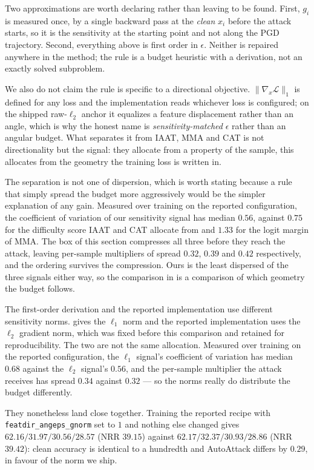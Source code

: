 Two approximations are worth declaring rather than leaving to be found. First, $g_i$ is measured once,
by a single backward pass at the \emph{clean} $x_i$ before the attack starts, so it is the sensitivity
at the starting point and not along the PGD trajectory. Second, everything above is first order in
$\epsilon$. Neither is repaired anywhere in the method; the rule is a budget heuristic with a
derivation, not an exactly solved subproblem.

We also do not claim the rule is specific to a directional objective. $\lVert\nabla_x\mathcal{L}\rVert_1$
is defined for any loss and the implementation reads whichever loss is configured; on the shipped
raw-$\ell_2$ anchor it equalizes a feature displacement rather than an angle, which is why the honest
name is \emph{sensitivity-matched} $\epsilon$ rather than an angular budget. What separates it from
IAAT, MMA and CAT is not directionality but the signal: they allocate from a property of the sample,
this allocates from the geometry the training loss is written in.

The separation is not one of dispersion, which is worth stating because a rule that simply spread the
budget more aggressively would be the simpler explanation of any gain. Measured over training on the
reported configuration, the coefficient of variation of our sensitivity signal has median $0.56$,
against $0.75$ for the difficulty score IAAT and CAT allocate from and $1.33$ for the logit margin of
MMA. The box of this section compresses all three before they reach the attack, leaving per-sample
multipliers of spread $0.32$, $0.39$ and $0.42$ respectively, and the ordering survives the
compression. Ours is the least dispersed of the three signals either way, so the comparison in
 is a comparison of which geometry the budget follows.

The first-order derivation and the reported implementation use different sensitivity norms.  gives the
$\ell_1$ norm and the reported implementation uses the $\ell_2$ gradient norm, which was fixed before this comparison and retained for reproducibility. The
two are not the same allocation.
Measured over training on the reported configuration, the $\ell_1$ signal's coefficient of variation
has median $0.68$ against the $\ell_2$ signal's $0.56$, and the per-sample multiplier the attack
receives has spread $0.34$ against $0.32$ --- so the norms really do distribute the budget
differently.

They nonetheless land close together. Training the reported recipe with
\texttt{featdir\_angeps\_gnorm} set to $1$ and nothing else changed gives $62.16 / 31.97 / 30.56 /
28.57$ (NRR $39.15$) against $62.17 / 32.37 / 30.93 / 28.86$ (NRR $39.42$): clean accuracy is
identical to a hundredth and AutoAttack differs by $0.29$, in favour of the norm we ship.

